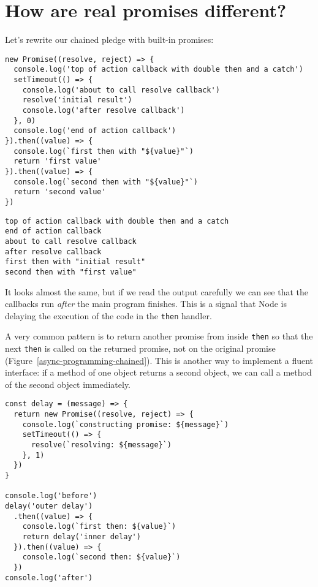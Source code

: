 \documentclass[krantzl]{krantz}
\newcommand{\figref}[1]{Figure~\ref{#1}}
\begin{document}
\section{How are real promises different?}\label{async-programming-real}


Let’s rewrite our chained pledge with built-in promises:


\begin{lstlisting}[frame=tblr]
new Promise((resolve, reject) => {
  console.log('top of action callback with double then and a catch')
  setTimeout(() => {
    console.log('about to call resolve callback')
    resolve('initial result')
    console.log('after resolve callback')
  }, 0)
  console.log('end of action callback')
}).then((value) => {
  console.log(`first then with "${value}"`)
  return 'first value'
}).then((value) => {
  console.log(`second then with "${value}"`)
  return 'second value'
})
\end{lstlisting}



\begin{lstlisting}[frame=tblr,backgroundcolor=\color{black!5}]
top of action callback with double then and a catch
end of action callback
about to call resolve callback
after resolve callback
first then with "initial result"
second then with "first value"
\end{lstlisting}



It looks almost the same,
but if we read the output carefully
we can see that the callbacks run \emph{after} the main program finishes.
This is a signal that Node is delaying the execution of the code in the \texttt{then} handler.


A very common pattern is to return another promise from inside \texttt{then}
so that the next \texttt{then} is called on the returned promise,
not on the original promise
(\figref{async-programming-chained}).
This is another way to implement a fluent interface:
if a method of one object returns a second object,
we can call a method of the second object immediately.


\begin{lstlisting}[frame=tblr]
const delay = (message) => {
  return new Promise((resolve, reject) => {
    console.log(`constructing promise: ${message}`)
    setTimeout(() => {
      resolve(`resolving: ${message}`)
    }, 1)
  })
}

console.log('before')
delay('outer delay')
  .then((value) => {
    console.log(`first then: ${value}`)
    return delay('inner delay')
  }).then((value) => {
    console.log(`second then: ${value}`)
  })
console.log('after')
\end{lstlisting}
\end{document}
